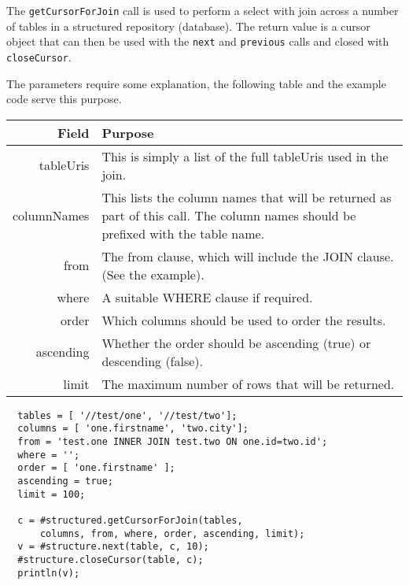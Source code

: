 The \verb+getCursorForJoin+ call is used to perform a select with join across a number of tables in a
structured repository (database). The return value is a cursor object that can then be used with the \verb+next+ and \verb+previous+ calls and closed with \verb+closeCursor+.


The parameters require some explanation, the following table and the example code serve this purpose.

\begin{table}[H]
\begin{center}
\begin{tabular}{r p{10cm}}
  Field & Purpose \\
  \hline
  tableUris & This is simply a list of the full tableUris used in the join. \\
  columnNames & This lists the column names that will be returned as part of this call. The column names should be prefixed with the table name. \\
  from & The from clause, which will include the JOIN clause. (See the example). \\
  where & A suitable WHERE clause if required. \\
  order & Which columns should be used to order the results. \\
  ascending & Whether the order should be ascending (true) or descending (false). \\
  limit & The maximum number of rows that will be returned. \\
\end{tabular}
\end{center}
\end{table}

\begin{Verbatim}
  tables = [ '//test/one', '//test/two'];
  columns = [ 'one.firstname', 'two.city'];
  from = 'test.one INNER JOIN test.two ON one.id=two.id';
  where = '';
  order = [ 'one.firstname' ];
  ascending = true;
  limit = 100;

  c = #structured.getCursorForJoin(tables,
      columns, from, where, order, ascending, limit);
  v = #structure.next(table, c, 10);
  #structure.closeCursor(table, c);
  println(v);
\end{Verbatim}
